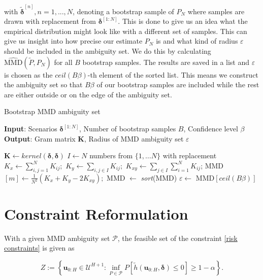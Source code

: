 with $\tilde{\boldsymbol{\delta}}^{[n]}, n = 1,...,N$, denoting a bootstrap sample of $P_N$ where samples are drawn with replacement from $\boldsymbol{\delta}^{[1:N]}$. This is done to give us an idea what the empirical distribution might look like with a different set of samples. This can give us insight into how precise our estimate $P_N$ is and what kind of radius $\varepsilon$ should be included in the ambiguity set. We do this by calculating $\widehat{\text{MMD}} (\tilde{P}, P_N)$ for all $B$ bootstrap samples. The results are saved in a list and $\varepsilon$ is chosen as the $\textit{ceil}(B \beta)$-th element of the sorted list. This means we construct the ambiguity set so that $B \beta$ of our bootstrap samples are included while the rest are either outside or on the edge of the ambiguity set.


\begin{algorithm}[t]
	\caption{Bootstrap MMD ambiguity set}
	\label{alg:Bootstrap}
	\hspace*{\algorithmicindent} \textbf{Input}: Scenarios $ \boldsymbol{\delta}^{[1:N]} $, Number of bootstrap samples $B$, Confidence level $\beta$ \\
	\hspace*{\algorithmicindent} \textbf{Output}: Gram matrix $\boldsymbol{K}$, Radius of MMD ambiguity set $\varepsilon$
	\begin{algorithmic}[1]
		\State $\boldsymbol{K} \gets \textit{kernel}(\boldsymbol{\delta}, \boldsymbol{\delta})$
			\State $I \gets N$ numbers from $\{1, \dots N \}$ with replacement
			\State $K_x \gets \sum_{i,j = 1}^N K_{ij};$
			\State $K_y \gets \sum_{i,j \in I} K_{ij};$
			\State $K_{xy} \gets \sum_{j \in I} \sum_{i = 1}^N K_{ij}$;
			\State MMD$[m] \gets \frac{1}{N^2} \left( K_x + K_y - 2 K_{xy} \right) ;$
		\EndFor
		\State MMD $\gets$ \textit{sort}(MMD)
		\State $\varepsilon \gets$ MMD$\left[ \textit{ceil} (B \beta) \right]$
	\end{algorithmic}
\end{algorithm}

\section{Constraint Reformulation} \label{Constraint Reformulation}

With a given MMD ambiguity set $\mathcal{P}$, the feasible set of the constraint \eqref{risk constraints} is given as

\begin{equation} \label{feasible set}
	Z :=  \left\{ \boldsymbol{u}_{0:H} \in \mathcal{U}^{H+1} : \inf\limits_{P \in \mathcal{P}}P \left[ \tilde{h}(\boldsymbol{u}_{0:H},  \boldsymbol{\delta}) \leq 0 \right] \geq 1 - \alpha \right\}.
\end{equation}

